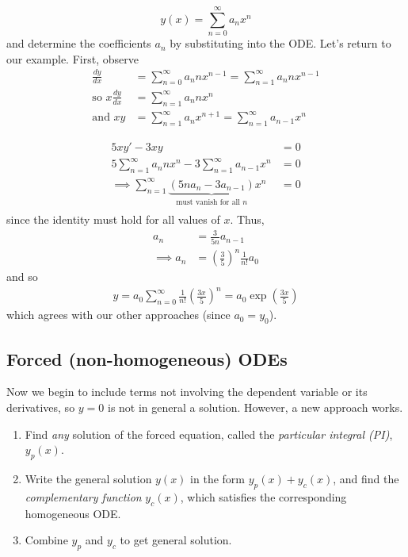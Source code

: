 \documentclass{../template/note}
\begin{document}
    \[
        y(x) = \sum_{n=0}^\infty a_nx^n
    \]
    and determine the coefficients \(a_n\) by substituting into the ODE. Let's return to our example. First, observe
    \begin{align*}
        \frac{dy}{dx} &= \sum_{n=0}^\infty a_n n x^{n-1} = \sum_{n=1}^\infty a_n n x^{n-1} \\
        \text{so } x \frac{dy}{dx} &= \sum_{n=1}^\infty a_n n x^n \\
        \text{and } xy &= \sum_{n=1}^\infty a_n x^{n+1} = \sum_{n=1}^\infty a_{n-1}x^n
    \end{align*}
    

    \begin{example}
        \begin{align*}
            5xy'-3xy&=0 \\
            5\sum_{n=1}^\infty a_nnx^n - 3\sum_{n=1}^\infty a_{n-1}x^n &= 0 \\
            \implies \sum_{n=1}^\infty \underbrace{(5na_n - 3a_{n-1})}_{\text{must vanish for all }n}x^n &= 0 \\
        \end{align*}
        since the identity must hold for all values of \(x\). Thus,
        \begin{align*}
            a_n &= \frac{3}{5n}a_{n-1} \\
            \implies a_n &= \left(\frac 3 5 \right)^n \frac{1}{n!} a_0
        \end{align*}
        and so
        \begin{align*}
            y = a_0 \sum_{n=0}^\infty \frac{1}{n!} \left(\frac{3x}{5}\right)^n = a_0 \exp\left(\frac{3x}{5}\right)
        \end{align*}
        which agrees with our other approaches (since \(a_0 = y_0\)).
    \end{example}
    
    \subsection{Forced (non-homogeneous) ODEs}

    Now we begin to include terms not involving the dependent variable or its derivatives, so \(y=0\) is not in general a solution. However, a new approach works.

    \begin{enumerate}[label=\protect\circled{\arabic*}]
        \item Find \emph{any} solution of the forced equation, called the \emph{particular integral (PI)}, \(y_p(x)\).
        \item Write the general solution \(y(x)\) in the form \(y_p(x) + y_c(x)\), and find the \emph{complementary function} \(y_c(x)\), which satisfies the corresponding homogeneous ODE.
        \item Combine \(y_p\) and \(y_c\) to get general solution. 
    \end{enumerate}
    
\end{document}
